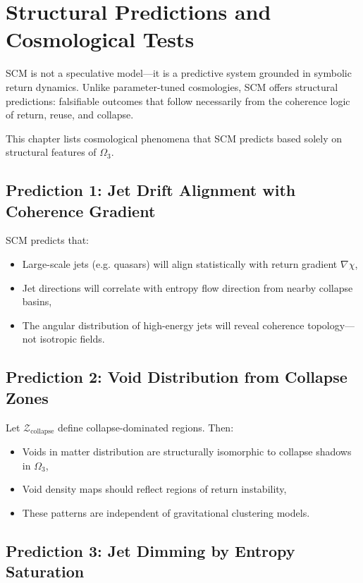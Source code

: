 \chapter{Structural Predictions and Cosmological Tests} \label{chapter-cosmological-predictions}

SCM is not a speculative model—it is a predictive system grounded in symbolic return dynamics. Unlike parameter-tuned cosmologies, SCM offers structural predictions: falsifiable outcomes that follow necessarily from the coherence logic of return, reuse, and collapse.

This chapter lists cosmological phenomena that SCM predicts based solely on structural features of $\Omega_3$.

\section{Prediction 1: Jet Drift Alignment with Coherence Gradient} \label{sec:jet-drift}

SCM predicts that:
\begin{itemize}
  \item Large-scale jets (e.g. quasars) will align statistically with return gradient $\nabla\chi$,
  \item Jet directions will correlate with entropy flow direction from nearby collapse basins,
  \item The angular distribution of high-energy jets will reveal coherence topology—not isotropic fields.
\end{itemize}

\section{Prediction 2: Void Distribution from Collapse Zones} \label{sec:void-distribution}

Let $\mathcal{Z}_{\text{collapse}}$ define collapse-dominated regions. Then:
\begin{itemize}
  \item Voids in matter distribution are structurally isomorphic to collapse shadows in $\Omega_3$,
  \item Void density maps should reflect regions of return instability,
  \item These patterns are independent of gravitational clustering models.
\end{itemize}

\section{Prediction 3: Jet Dimming by Entropy Saturation} \label{sec:jet-dimming}


